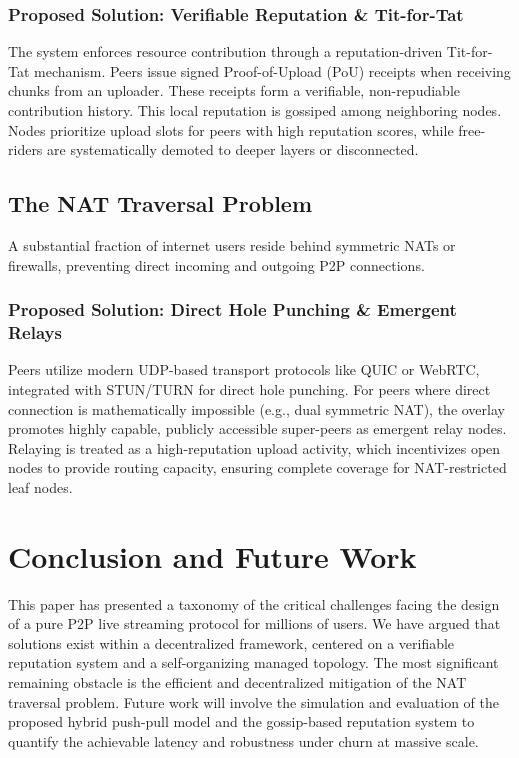 \documentclass[journal]{IEEEtran}
\begin{document}
\subsubsection{Proposed Solution: Verifiable Reputation \& Tit-for-Tat}
The system enforces resource contribution through a reputation-driven Tit-for-Tat mechanism. Peers issue signed Proof-of-Upload (PoU) receipts when receiving chunks from an uploader. These receipts form a verifiable, non-repudiable contribution history. This local reputation is gossiped among neighboring nodes. Nodes prioritize upload slots for peers with high reputation scores, while free-riders are systematically demoted to deeper layers or disconnected.

\subsection{The NAT Traversal Problem}
A substantial fraction of internet users reside behind symmetric NATs or firewalls, preventing direct incoming and outgoing P2P connections.

\subsubsection{Proposed Solution: Direct Hole Punching \& Emergent Relays}
Peers utilize modern UDP-based transport protocols like QUIC or WebRTC, integrated with STUN/TURN for direct hole punching. For peers where direct connection is mathematically impossible (e.g., dual symmetric NAT), the overlay promotes highly capable, publicly accessible super-peers as emergent relay nodes. Relaying is treated as a high-reputation upload activity, which incentivizes open nodes to provide routing capacity, ensuring complete coverage for NAT-restricted leaf nodes.

\section{Conclusion and Future Work}
This paper has presented a taxonomy of the critical challenges facing the design of a pure P2P live streaming protocol for millions of users. We have argued that solutions exist within a decentralized framework, centered on a verifiable reputation system and a self-organizing managed topology. The most significant remaining obstacle is the efficient and decentralized mitigation of the NAT traversal problem. Future work will involve the simulation and evaluation of the proposed hybrid push-pull model and the gossip-based reputation system to quantify the achievable latency and robustness under churn at massive scale.
\end{document}
